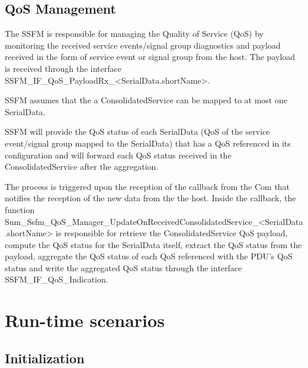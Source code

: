 { }


\subsection{QoS Management}
\label{subsec:QoSDynamic}

The SSFM is responsible for managing the Quality of Service (QoS) by monitoring the received service events/signal group diagnostics and payload received in the form of service event or signal group from the host. 
The payload is received through the interface SSFM_IF_QoS_PayloadRx_<SerialData.shortName>. 

SSFM assumes that the a ConsolidatedService can be mapped to at most one SerialData.


SSFM will provide the QoS status of each SerialData (QoS of the service event/signal group mapped to the SerialData) that has a QoS referenced in its configuration and will forward each 
QoS status received in the ConsolidatedService after the aggregation. 

{}


The process is triggered upon the reception of the callback from the Com that notifies the reception of the new data from the the host. 
Inside the callback, the function Sum_Ssfm_QoS_Manager_UpdateOnReceivedConsolidatedService_<SerialData.shortName> is responsible for 
retrieve the ConsolidatedService QoS payload, compute the QoS status for the SerialData itself, extract the QoS status from the payload,
aggregate the QoS status of each QoS referenced with the PDU's QoS status and write the aggregated QoS status through the interface SSFM_IF_QoS_Indication.

{ }

\section{Run-time scenarios}
\label{sec:RunTimeScenarios}
\subsection{Initialization}
{}

